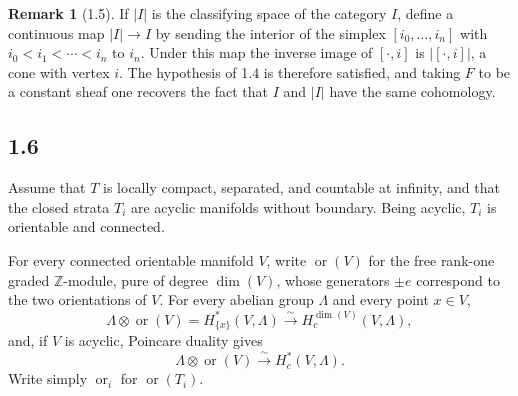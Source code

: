 \documentclass[11pt]{article}
\theoremstyle{definition}
\newtheorem{remark}[theorem]{Remark}
\newcommand{\ZZ}{\mathbb Z}
\newcommand{\ornt}{\operatorname{or}}
\begin{document}
\begin{remark}[1.5]
If $|I|$ is the classifying space of the category $I$, define a continuous map $|I|\to I$ by sending the interior of the simplex $[i_0,\ldots,i_n]$ with $i_0<i_1<\cdots<i_n$ to $i_n$.  Under this map the inverse image of $[\cdot,i]$ is $|[\cdot,i]|$, a cone with vertex $i$.  The hypothesis of 1.4 is therefore satisfied, and taking $F$ to be a constant sheaf one recovers the fact that $I$ and $|I|$ have the same cohomology.
\end{remark}

\subsection*{1.6}
Assume that $T$ is locally compact, separated, and countable at infinity, and that the closed strata $T_i$ are acyclic manifolds without boundary.  Being acyclic, $T_i$ is orientable and connected.

For every connected orientable manifold $V$, write $\ornt(V)$ for the free rank-one graded $\ZZ$-module, pure of degree $\dim(V)$, whose generators $\pm e$ correspond to the two orientations of $V$.  For every abelian group $\Lambda$ and every point $x\in V$,
\begin{equation}
\Lambda\otimes\ornt(V)=H^*_{\{x\}}(V,\Lambda)\xrightarrow{\sim}H_c^{\dim(V)}(V,\Lambda),\tag{1.6.1}
\end{equation}
and, if $V$ is acyclic, Poincare duality gives
\begin{equation}
\Lambda\otimes\ornt(V)\xrightarrow{\sim}H_c^*(V,\Lambda).\tag{1.6.2}
\end{equation}
Write simply $\ornt_i$ for $\ornt(T_i)$.
\end{document}
